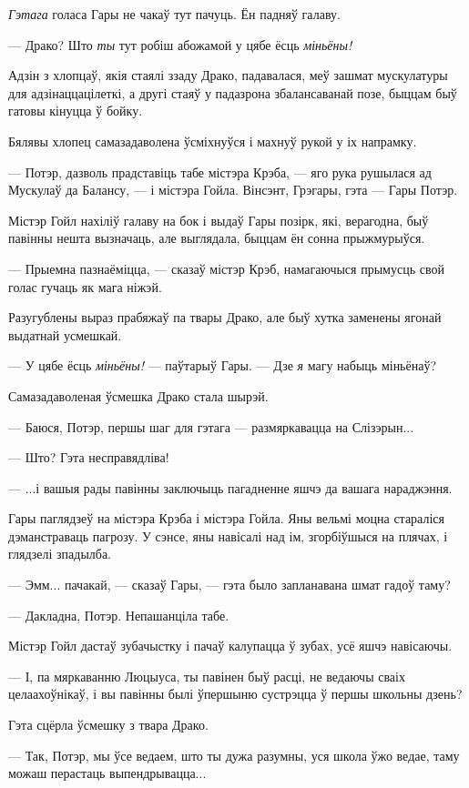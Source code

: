 \emph{Гэтага} голаса Гары не чакаў тут пачуць. Ён падняў галаву.

--- Драко? Што \emph{ты} тут робіш абожамой у цябе ёсць \emph{міньёны!}

Адзін з хлопцаў, якія стаялі ззаду Драко, падавалася, меў зашмат мускулатуры для 
адзінаццацілеткі, а другі стаяў у падазрона збалансаванай позе,
быццам быў гатовы кінуцца ў бойку.

Бялявы хлопец самазадаволена ўсміхнуўся і махнуў рукой у іх напрамку. 

--- Потэр, дазволь прадставіць табе містэра Крэба, --- яго рука рушылася ад Мускулаў 
да Балансу, --- і містэра Гойла. Вінсэнт, Грэгары, гэта --- Гары Потэр.

Містэр Гойл нахіліў галаву на бок і выдаў Гары позірк, які, верагодна, быў 
павінны нешта вызначаць, але выглядала, быццам ён сонна прыжмурыўся.

--- Прыемна пазнаёміцца, --- сказаў містэр Крэб, намагаючыся
прымусць свой голас гучаць як мага ніжэй.

Разугублены выраз прабяжаў па твары Драко, але быў хутка заменены 
ягонай выдатнай усмешкай.

--- У цябе ёсць \emph{міньёны!} --- паўтарыў Гары. --- Дзе \emph{я} магу набыць міньёнаў?

Самазадаволеная ўсмешка Драко стала шырэй.

--- Баюся, Потэр, першы шаг для гэтага --- размяркавацца на Слізэрын...

--- Што? Гэта несправядліва!

--- ...і вашыя рады павінны заключыць пагадненне яшчэ да вашага нараджэння.

Гары паглядзеў на містэра Крэба і містэра Гойла. Яны вельмі моцна стараліся 
дэманстраваць пагрозу. У сэнсе, яны навісалі над ім, згорбіўшыся на плячах, і 
глядзелі зпадылба.

--- Эмм... пачакай, --- сказаў Гары, --- гэта было запланавана шмат гадоў таму?

--- Дакладна, Потэр. Непашанціла табе.

Містэр Гойл дастаў зубачыстку і пачаў калупацца ў зубах, усё яшчэ навісаючы.

--- І, па мяркаванню Люцыуса, ты павінен быў расці, не ведаючы сваіх целаахоўнікаў,
і вы павінны былі ўпершыню сустрэцца ў першы школьны дзень?

Гэта сцёрла ўсмешку з твара Драко.

--- Так, Потэр, мы ўсе ведаем, што ты дужа разумны, уся школа ўжо ведае, 
таму можаш перастаць выпендрывацца...

